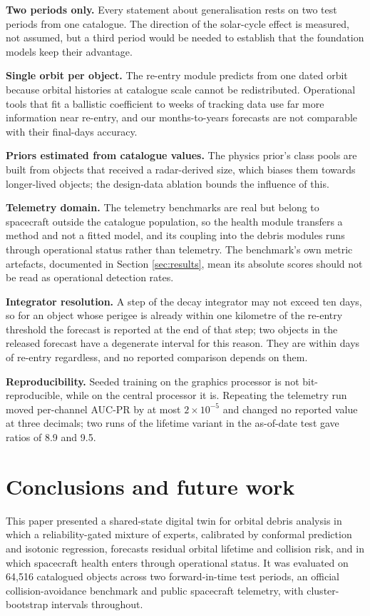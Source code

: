 \documentclass[3p,times]{elsarticle}
\begin{document}
\textbf{Two periods only.} Every statement about generalisation rests on
two test periods from one catalogue. The direction of the solar-cycle
effect is measured, not assumed, but a third period would be needed to
establish that the foundation models keep their advantage.

\textbf{Single orbit per object.} The re-entry module predicts from one
dated orbit because orbital histories at catalogue scale cannot be
redistributed. Operational tools that fit a ballistic coefficient to
weeks of tracking data use far more information near re-entry, and our
months-to-years forecasts are not comparable with their final-days
accuracy.

\textbf{Priors estimated from catalogue values.} The physics prior's
class pools are built from objects that received a radar-derived size,
which biases them towards longer-lived objects; the design-data ablation
bounds the influence of this.

\textbf{Telemetry domain.} The telemetry benchmarks are real but belong
to spacecraft outside the catalogue population, so the health module
transfers a method and not a fitted model, and its coupling into the
debris modules runs through operational status rather than telemetry.
The benchmark's own metric artefacts, documented in Section
\ref{sec:results}, mean its absolute scores should not be read as
operational detection rates.

\textbf{Integrator resolution.} A step of the decay integrator may not
exceed ten days, so for an object whose perigee is already within one
kilometre of the re-entry threshold the forecast is reported at the end
of that step; two objects in the released forecast have a degenerate
interval for this reason. They are within days of re-entry regardless,
and no reported comparison depends on them.

\textbf{Reproducibility.} Seeded training on the graphics processor is
not bit-reproducible, while on the central processor it is. Repeating
the telemetry run moved per-channel AUC-PR by at most
\(2 \times 10^{-5}\) and changed no reported value at three decimals;
two runs of the lifetime variant in the as-of-date test gave ratios of
8.9 and 9.5.

\section{Conclusions and future work}\label{sec:conclusion}

This paper presented a shared-state digital twin for orbital debris
analysis in which a reliability-gated mixture of experts, calibrated by
conformal prediction and isotonic regression, forecasts residual orbital
lifetime and collision risk, and in which spacecraft health enters
through operational status. It was evaluated on 64,516 catalogued
objects across two forward-in-time test periods, an official
collision-avoidance benchmark and public spacecraft telemetry, with
cluster-bootstrap intervals throughout.
\end{document}

